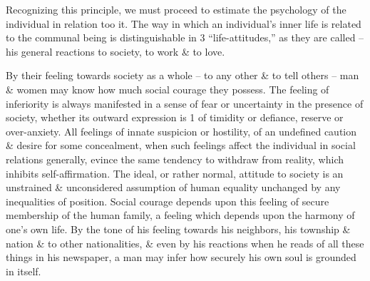 \documentclass{article}
\numberwithin{equation}{section}
\begin{document}
Recognizing this principle, we must proceed to estimate the psychology of the individual in relation too it. The way in which an individual's inner life is related to the communal being is distinguishable in 3 ``life-attitudes,'' as they are called -- his general reactions to society, to work \& to love.

By their feeling towards society as a whole -- to any other \& to tell others -- man \& women may know how much social courage they possess. The feeling of inferiority is always manifested in a sense of fear or uncertainty in the presence of society, whether its outward expression is 1 of timidity or defiance, reserve or over-anxiety. All feelings of innate suspicion or hostility, of an undefined caution \& desire for some concealment, when such feelings affect the individual in social relations generally, evince the same tendency to withdraw from reality, which inhibits self-affirmation. The ideal, or rather normal, attitude to society is an unstrained \& unconsidered assumption of human equality unchanged by any inequalities of position. Social courage depends upon this feeling of secure membership of the human family, a feeling which depends upon the harmony of one's own life. By the tone of his feeling towards his neighbors, his township \& nation \& to other nationalities, \& even by his reactions when he reads of all these things in his newspaper, a man may infer how securely his own soul is grounded in itself.
\end{document}
